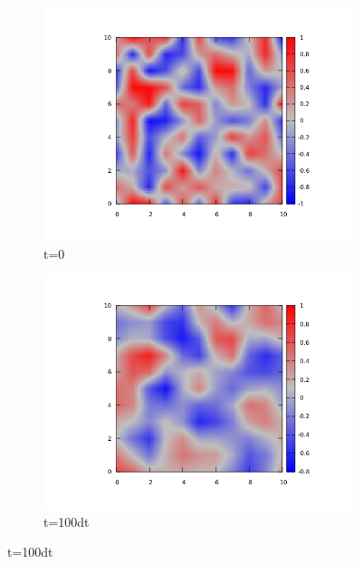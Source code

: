 \documentclass{article}
\begin{document}
\begin{figure}
\centering
\begin{subfigure}{.5\textwidth}
  \centering
  \includegraphics[width=1.0\linewidth]{initial.png}
  \caption{t=0}
  \label{fig:sub1}
\end{subfigure}%
\begin{subfigure}{.5\textwidth}
  \centering
  \includegraphics[width=1.0\linewidth]{100dt.png}
  \caption{t=100dt}
  \label{fig:sub2}
\end{subfigure}
\label{fig:test}
\end{figure}
\end{document}

